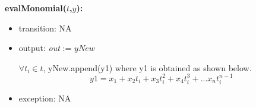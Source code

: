 \documentclass[12pt, titlepage]{article}
\begin{document}
\noindent \textbf{evalMonomial($t$,$y$):}
\begin{itemize}
	\item transition: NA
	
	\item output:  \textit{out} := $yNew$
	
	$\forall t_i \in t$, yNew.append(y1) where y1 is obtained as shown below.
	\begin{equation*}
	y1 = x_1 + x_2 t_i + x_3 t_i ^2 + x_4 t_i ^3 + ... x_n t_i ^{n-1}  
	\end{equation*}
	
	\item exception: NA
\end{itemize}

\end{document}
